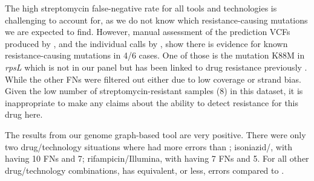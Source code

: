 The high streptomycin false-negative rate for all tools and technologies is challenging to account for, as we do not know which resistance-causing mutations we are expected to find. However, manual assessment of the prediction VCFs produced by \drprg{}, and the individual calls by \mykrobe{}, show there is evidence for known resistance-causing mutations in 4/6 cases. One of those is the mutation K88M in \textit{rpsL} which is not in our panel but has been linked to drug resistance previously \cite{Smittipat2016}. While the other FNs were filtered out either due to low coverage or strand bias. Given the low number of streptomycin-resistant samples (8) in this dataset, it is inappropriate to make any claims about the ability to detect resistance for this drug here.

The results from our genome graph-based tool \drprg{} are very positive. There were only two drug/technology situations where \drprg{} had more errors than \mykrobe{}; isoniazid/\ont{}, with \drprg{} having 10 FNs and \mykrobe{} 7; rifampicin/Illumina, with \drprg{} having 7 FNs and \mykrobe{} 5. For all other drug/technology combinations, \drprg{} has equivalent, or less, errors compared to \mykrobe{}.

